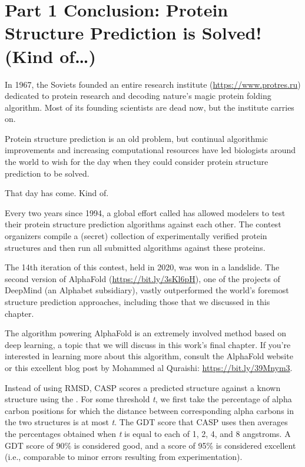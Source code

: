 \FloatBarrier
{}

\section{Part 1 Conclusion: Protein Structure Prediction is Solved! (Kind of…)}
\label{sec:conclusion_part_1}

In 1967, the Soviets founded an entire research institute (\url{https://www.protres.ru}) dedicated to protein research and decoding nature's magic protein folding algorithm. Most of its founding scientists are dead now, but the institute carries on.

Protein structure prediction is an old problem, but continual algorithmic improvements and increasing computational resources have led biologists around the world to wish for the day when they could consider protein structure prediction to be solved.

That day has come. Kind of.

Every two years since 1994, a global effort called  has allowed modelers to test their protein structure prediction algorithms against each other. The contest organizers compile a (secret) collection of experimentally verified protein structures and then run all submitted algorithms against these proteins.

The 14th iteration of this contest, held in 2020, was won in a landslide. The second version of AlphaFold (\url{https://bit.ly/3sKl6pH}), one of the projects of DeepMind (an Alphabet subsidiary), vastly outperformed the world's foremost structure prediction approaches, including those that we discussed in this chapter.

The algorithm powering AlphaFold is an extremely involved method based on deep learning, a topic that we will discuss in this work's final chapter. If you're interested in learning more about this algorithm, consult the AlphaFold website or this excellent blog post by Mohammed al Quraishi: \url{https://bit.ly/39Mnym3}.

Instead of using RMSD, CASP scores a predicted structure against a known structure using the . For some threshold \textit{t}, we first take the percentage of alpha carbon positions for which the distance between corresponding alpha carbons in the two structures is at most \textit{t}. The GDT score that CASP uses then averages the percentages obtained when \textit{t} is equal to each of 1, 2, 4, and 8 angstroms. A GDT score of 90\% is considered good, and a score of 95\% is considered excellent (i.e., comparable to minor errors resulting from experimentation).

